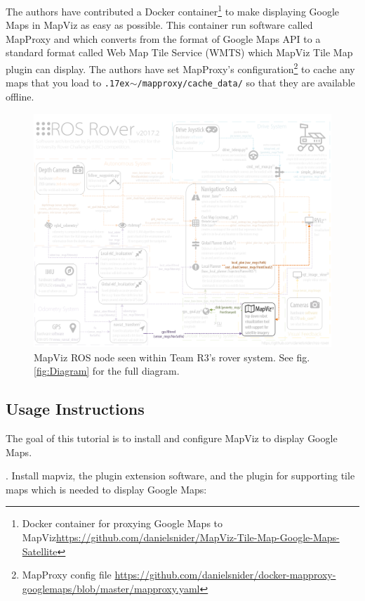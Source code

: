 \documentclass[runningheads,a4paper]{llncs}
\begin{document}
The authors have contributed a Docker container\footnote{Docker container for proxying Google Maps to MapViz\url{https://github.com/danielsnider/MapViz-Tile-Map-Google-Maps-Satellite}} to make displaying Google Maps in MapViz as easy as possible. This container run software called MapProxy and which converts from the format of Google Maps API to a standard format called Web Map Tile Service (WMTS) which MapViz Tile Map plugin can display. The authors have set MapProxy's configuration\footnote{MapProxy config file \url{https://github.com/danielsnider/docker-mapproxy-googlemaps/blob/master/mapproxy.yaml}} to cache any maps that you load to \texttt{{\raise.17ex\hbox{$\scriptstyle\sim$}}/mapproxy/cache\_data/} so that they are available offline.


\begin{figure}
\centering
\includegraphics[width=\textwidth]{Mapviz_Diagram}
\caption{MapViz ROS node seen within Team R3's rover system. See fig. \ref{fig:Diagram} for the full diagram.}
\label{fig:Mapviz_Diagram}
\end{figure}

\subsection{Usage Instructions}
The goal of this tutorial is to install and configure MapViz to display Google Maps.

. Install mapviz, the plugin extension software, and the plugin for supporting tile maps which is needed to display Google Maps:
\end{document}
